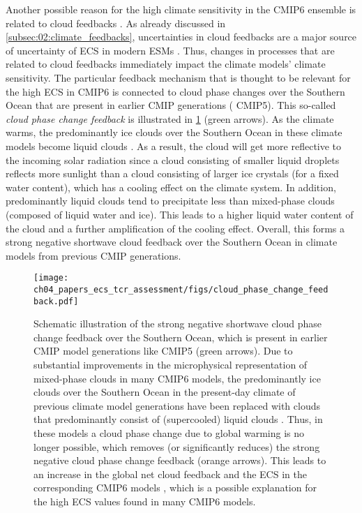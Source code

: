 Another possible reason for the high climate sensitivity in the \acs{CMIP}6
ensemble is related to cloud feedbacks \autocite{Bock2020}. As already
discussed in \cref{subsec:02:climate_feedbacks}, uncertainties in cloud
feedbacks are a major source of uncertainty of \ac{ECS} in modern \acp{ESM}
\autocite{Boucher2013, Flato2013}. Thus, changes in processes that are related
to cloud feedbacks immediately impact the climate models' climate sensitivity.
The particular feedback mechanism that is thought to be relevant for the high
\ac{ECS} in \acs{CMIP}6 is connected to cloud phase changes over the Southern
Ocean that are present in earlier \ac{CMIP} generations (\eg{} \acs{CMIP}5).
This so-called \emph{cloud phase change feedback} is illustrated in
\cref{fig:04:cloud_phase_change_feedback} (green arrows). As the climate warms,
the predominantly ice clouds over the Southern Ocean in these climate models
become liquid clouds \autocite{McCoy2015}. As a result, the cloud will get more
reflective to the incoming solar radiation since a cloud consisting of smaller
liquid droplets reflects more sunlight than a cloud consisting of larger ice
crystals (for a fixed water content), which has a cooling effect on the climate
system. In addition, predominantly liquid clouds tend to precipitate less than
mixed-phase clouds (composed of liquid water and ice). This leads to a higher
liquid water content of the cloud and a further amplification of the cooling
effect. Overall, this forms a strong negative shortwave cloud feedback over the
Southern Ocean in climate models from previous \ac{CMIP} generations.

\begin{figure}[t]
  \centering
  \texttt{[image: 
    ch04\_papers\_ecs\_tcr\_assessment/figs/cloud\_phase\_change\_feedback.pdf]}
  \caption{Schematic illustration of the strong negative shortwave cloud phase
    change feedback over the Southern Ocean, which is present in earlier
    \acs{CMIP} model generations like \acs{CMIP}5 (green arrows). Due to
    substantial improvements in the microphysical representation of mixed-phase
    clouds in many \acs{CMIP}6 models, the predominantly ice clouds over the
    Southern Ocean in the present-day climate of previous climate model
    generations have been replaced with clouds that predominantly consist of
    (supercooled) liquid clouds \autocite{BodasSalcedo2019, Gettelman2019,
      Mulcahy2020, Williams2020}. Thus, in these models a cloud phase change
    due to global warming is no longer possible, which removes (or
    significantly reduces) the strong negative cloud phase change feedback
    (orange arrows). This leads to an increase in the global net cloud
    feedback \autocite{BodasSalcedo2019, Tan2016} and the \acf{ECS} in the
    corresponding \acs{CMIP}6 models \autocite{Andrews2019, Gettelman2019},
    which is a possible explanation for the high \acs{ECS} values found in
    many \acs{CMIP}6 models.}
  \label{fig:04:cloud_phase_change_feedback}
\end{figure}


